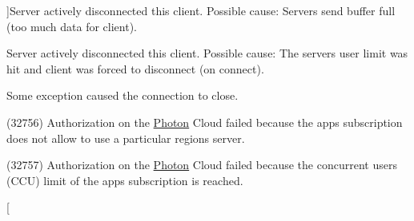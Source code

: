 \begin{Desc}
\begin{description}
{}]Server actively disconnected this client. Possible cause\+: Server\textquotesingle{}s send buffer full (too much data for client).\item[{\em 
Disconnect\+By\+Server\+User\+Limit\hypertarget{group__public_api_ggad61b1461cf60ad9e8d86923d111d5cc9a443ec8de9a697e190f4b24ab3ab36a9d}{}\label{group__public_api_ggad61b1461cf60ad9e8d86923d111d5cc9a443ec8de9a697e190f4b24ab3ab36a9d}
}]Server actively disconnected this client. Possible cause\+: The server\textquotesingle{}s user limit was hit and client was forced to disconnect (on connect).\item[{\em 
Exception\hypertarget{group__public_api_ggad61b1461cf60ad9e8d86923d111d5cc9ab0d4998a26f5b5742ad38c4af8817e32}{}\label{group__public_api_ggad61b1461cf60ad9e8d86923d111d5cc9ab0d4998a26f5b5742ad38c4af8817e32}
}]Some exception caused the connection to close.\item[{\em 
Invalid\+Region\hypertarget{group__public_api_ggad61b1461cf60ad9e8d86923d111d5cc9aa8534012cb63e62c0b3a2335206117cc}{}\label{group__public_api_ggad61b1461cf60ad9e8d86923d111d5cc9aa8534012cb63e62c0b3a2335206117cc}
}](32756) Authorization on the \hyperlink{namespace_photon}{Photon} Cloud failed because the app\textquotesingle{}s subscription does not allow to use a particular region\textquotesingle{}s server.\item[{\em 
Max\+Ccu\+Reached\hypertarget{group__public_api_ggad61b1461cf60ad9e8d86923d111d5cc9a522f961eb7a2b35f0ef4b99b4ad3bb0a}{}\label{group__public_api_ggad61b1461cf60ad9e8d86923d111d5cc9a522f961eb7a2b35f0ef4b99b4ad3bb0a}
}](32757) Authorization on the \hyperlink{namespace_photon}{Photon} Cloud failed because the concurrent users (C\+CU) limit of the app\textquotesingle{}s subscription is reached.\item[{\em 
}
\end{description}
\end{Desc}
